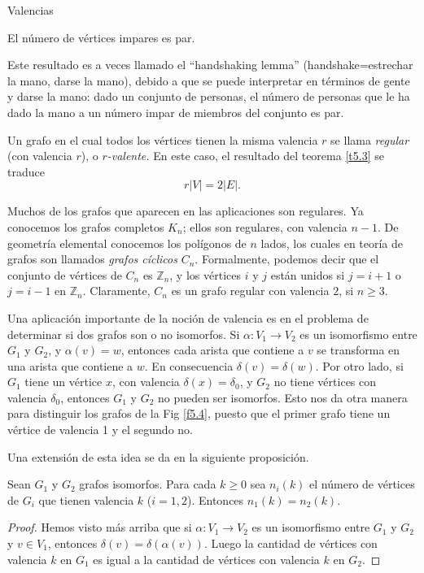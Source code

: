 \begin{section}{Valencias}
\begin{teorema} El número de vértices impares es par.
\end{teorema}

Este resultado es a veces llamado el ``handshaking lemma'' (handshake=estrechar la mano, darse la   mano), debido a que se puede interpretar en términos de gente y darse la mano: dado un conjunto de personas, el número de personas que le ha dado la mano a un número impar de miembros del conjunto
es par. 

Un grafo en el cual todos los vértices tienen la misma valencia $r$ se llama \textit{regular}   (con valencia $r$), o \textit{$r$-valente.} En este caso, el resultado del teorema \ref{t5.3} se traduce
$$
r|V|=2|E|.
$$

Muchos de los grafos que aparecen en las aplicaciones son regulares. Ya conocemos los  grafos completos $K_n$; ellos son regulares, con valencia $n-1$. De geometría elemental conocemos los polígonos de $n$ lados, los cuales en teoría de grafos son llamados \textit{{grafos cíclicos}}   $C_n$. Formalmente, podemos decir que el conjunto de vértices de $C_n$ es $\mathbb Z_n$, y los vértices $i$ y $j$ están unidos si $j=i+1$ o $j=i-1$ en $\mathbb Z_n$. Claramente, $C_n$ es un grafo regular con valencia $2$, si $n\ge 3$.

Una aplicación importante de la noción de valencia es en el problema de determinar si dos grafos son o no isomorfos. Si $\alpha:V_1 \to  V_2$ es un isomorfismo entre $G_1$ y $G_2$, y $\alpha(v)=w$, entonces cada arista que contiene a $v$ se transforma en una arista que contiene a $w$. En consecuencia $\delta(v)=\delta(w)$. Por otro lado, si $G_1$ tiene un vértice $x$, con valencia $\delta(x)=\delta_0$, y $G_2$ no tiene vértices con valencia $\delta_0$, entonces $G_1$ y $G_2$ no pueden ser isomorfos. Esto nos da otra manera para distinguir los grafos de la Fig \ref{f5.4}, puesto que el primer grafo tiene un vértice de valencia 1 y el segundo no.

Una extensión de esta idea se da en la siguiente proposición.

\begin{proposicion}\label{criterioiso}Sean  $G_1$ y $G_2$ grafos isomorfos. Para cada $k\ge 0$ sea $n_i(k)$ el número de vértices de $G_i$ que tienen valencia $k$ ($i=1,2$). Entonces $n_1(k)=n_2(k)$.
\end{proposicion}
\begin{proof} Hemos visto más arriba que si $\alpha:V_1 \to  V_2$ es un isomorfismo entre $G_1$ y $G_2$ y $v\in V_1$, entonces $\delta(v)=\delta(\alpha(v))$. Luego la cantidad de vértices con valencia $k$ en $G_1$ es igual  a la cantidad de vértices con valencia $k$ en $G_2$.     
\end{proof}


\end{section}
